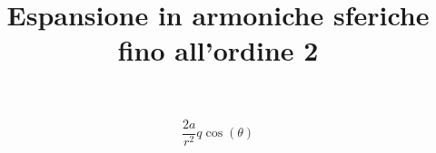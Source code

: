 \documentclass[11pt]{article}
\title{Espansione in armoniche sferiche fino all'ordine 2}
\begin{document}
 
\maketitle 


\[ \frac{2 a}{r^{2}} q \cos{\left (\theta \right )} \] 
\end{document}
